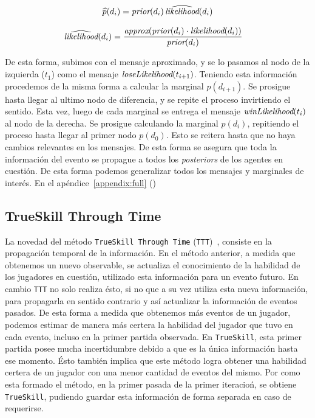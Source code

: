 \documentclass[11pt,twoside,spanish]{report} %
\begin{document}
\begin{equation}
\widehat{p}(d_i) = \emph{prior}(d_i) \, \widehat{\emph{likelihood}}(d_i)
\end{equation}

\begin{equation}
\begin{split}
\widehat{\emph{likelihood}}(d_i) &= \frac{\emph{approx}(\emph{prior}(d_i) \cdot \emph{likelihood}(d_i))}{ \emph{prior}(d_i)}
\end{split}
\end{equation}


De esta forma, subimos con el mensaje aproximado, y se lo pasamos al nodo de la izquierda ($t_1$) como el mensaje $\emph{loseLikelihood}(t_{i+1})$.
Teniendo esta informaci\'on procedemos de la misma forma a calcular la marginal $p(d_{i+1})$.
Se prosigue hasta llegar al ultimo nodo de diferencia, y se repite el proceso invirtiendo el sentido.
Esta vez, luego de cada marginal se entrega el mensaje $\emph{winLikelihood}(t_{i})$ al nodo de la derecha.
Se prosigue calculando la marginal $p(d_{i})$, repitiendo el proceso hasta llegar al primer nodo $p(d_{0})$.
Esto se reitera hasta que no haya cambios relevantes en los mensajes.
De esta forma se asegura que toda la informaci\'on del evento se propague a todos los \textit{posteriors} de los agentes en cuesti\'on.
De esta forma podemos generalizar todos los mensajes y marginales de inter\'es.
En el ap\'endice~\ref{appendix:full} ()





\subsection{TrueSkill Through Time}\label{Sec:TTT}


La novedad del m\'etodo  \texttt{TrueSkill Through Time} (\texttt{TTT})~\cite{Dangauthier2007}, consiste en la propagaci\'on temporal de la informaci\'on.
En el m\'etodo anterior, a medida que obtenemos un nuevo observable, se actualiza el conocimiento de la habilidad de los jugadores en cuesti\'on, utilizado esta informaci\'on para un evento futuro.
En cambio \texttt{TTT} no solo realiza \'esto, si no que a su vez utiliza esta nueva informaci\'on, para propagarla en sentido contrario y as\'i actualizar la informaci\'on de eventos pasados.
De esta forma a medida que obtenemos m\'as eventos de un jugador, podemos estimar de manera m\'as certera la habilidad del jugador  que tuvo en cada evento, incluso en la primer partida observada.
En \texttt{TrueSkill}, esta primer partida posee mucha incertidumbre debido a que es la \'unica informaci\'on hasta ese momento.
\'Esto tambi\'en implica que este m\'etodo logra  obtener una habilidad certera de un jugador con una menor cantidad de eventos del mismo.
Por como esta formado el m\'etodo, en la primer pasada de la primer iteracio\'n, se obtiene \texttt{TrueSkill}, pudiendo guardar esta informaci\'on de forma separada en caso de requerirse.
\end{document}
